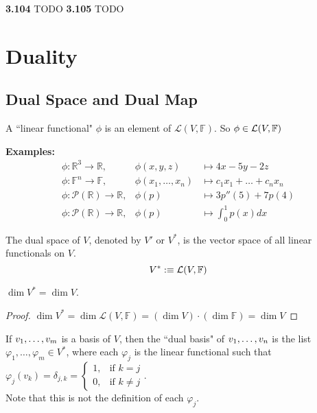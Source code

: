 \textbf{3.104} TODO \textbf{3.105} TODO \\

 \filbreak
\section{Duality}
\subsection{Dual Space and Dual Map}

\setcounter{thm}{107}
\begin{mydef}
    A ``linear functional" $\phi$ is an element of $\mathcal{L}(V, \mathbb{F})$. So $\phi \in \mathcal{L}(V, \mathbb{F})$
\end{mydef}

\textbf{Examples:} 
\begin{equation} 
	\begin{array}{lll}
		\phi: \mathbb{R}^3  \to \mathbb{R}, &\phi (x,y,z)  & \mapsto 4x-5y-2z \\
		\phi: \mathbb{F}^n  \to \mathbb{F}, &\phi (x_1, \dots, x_n)
		& \mapsto c_1x_1 + \dots + c_nx_n  \\
		\phi: \mathcal{P} (\mathbb{R})  \to \mathbb{R},
		& \phi(p) & \mapsto 3p''(5) + 7p(4) \\
		\phi: \mathcal{P}(\mathbb{R}) \to \mathbb{R}, 
		& \phi(p)  &\mapsto \textstyle \int_{0}^{1} p(x) dx
	\end{array}
\end{equation}

\setcounter{thm}{109}
\begin{thm}
    The dual space of $V$, denoted by $V'$ or $V^{*}$, is the vector space of all linear functionals on $V$.
    \begin{equation}
        V^{*} :\equiv \mathcal{L}(V, \mathbb{F})
    \end{equation}
\end{thm}

\begin{thm}
    $\dim V^{*} = \dim V$. 
\end{thm}
\begin{proof}
    $\dim V^{*} = \dim \mathcal{L}(V, \mathbb{F})=(\dim V) \cdot (\dim \mathbb{F}) = \dim V $
\end{proof}


\begin{mydef}
    If $v_1, \dots, v_m$ is a basis of $V$, then the ``dual basis" of $v_1, \dots, v_n$ is the list $\varphi_1, \dots, \varphi_m \in V^{*}$, where each $\varphi_j$ is the linear functional such that 
$\varphi_j(v_k) = \delta_{j,k} =
\begin{cases}
	1,  & \text{if $k=j$} \\
	0, & \text{if $k \neq j$}
\end{cases}$. \\
Note that this is not the definition of each $\varphi_j$.
\end{mydef}

